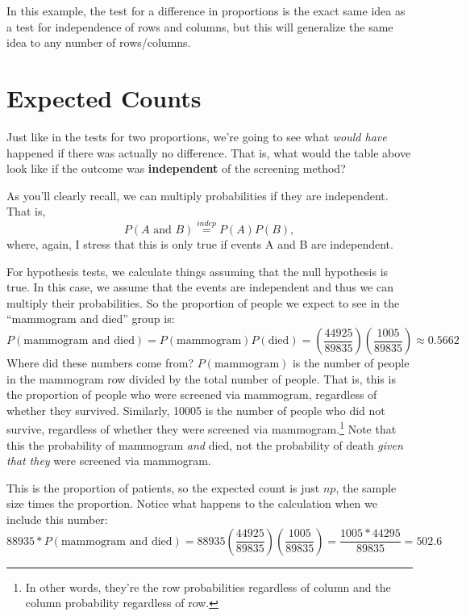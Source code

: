 \documentclass[
  letterpaper,
  DIV=11,
  numbers=noendperiod,
  oneside]{scrreprt}
\begin{document}
In this example, the test for a difference in proportions is the exact
same idea as a test for independence of rows and columns, but this will
generalize the same idea to any number of rows/columns.

\hypertarget{expected-counts}{%
\section{Expected Counts}\label{expected-counts}}

Just like in the tests for two proportions, we're going to see what
\emph{would have} happened if there was actually no difference. That is,
what would the table above look like if the outcome was
\textbf{independent} of the screening method?

As you'll clearly recall, we can multiply probabilities if they are
independent. That is, \[
P(A\text{ and }B) \stackrel{indep}{=}P(A)P(B),
\] where, again, I stress that this is only true if events A and B are
independent.

For hypothesis tests, we calculate things assuming that the null
hypothesis is true. In this case, we assume that the events are
independent and thus we can multiply their probabilities. So the
proportion of people we expect to see in the ``mammogram and died''
group is: \[
P(\text{mammogram and died}) = P(\text{mammogram})P(\text{died}) = \left(\frac{44925}{89835}\right)\left(\frac{1005}{89835}\right) \approx 0.5662
\] Where did these numbers come from? \(P(\text{mammogram})\) is the
number of people in the mammogram row divided by the total number of
people. That is, this is the proportion of people who were screened via
mammogram, regardless of whether they survived. Similarly, 10005 is the
number of people who did not survive, regardless of whether they were
screened via mammogram.\footnote{In other words, they're the row
  probabilities regardless of column and the column probability
  regardless of row.} Note that this the probability of mammogram
\emph{and} died, not the probability of death \emph{given that they}
were screened via mammogram.

This is the proportion of patients, so the expected count is just
\(np\), the sample size times the proportion. Notice what happens to the
calculation when we include this number: \[
88935 * P(\text{mammogram and died}) = 88935 \left(\frac{44925}{89835}\right)\left(\frac{1005}{89835}\right) = \frac{1005*44295}{89835} = 502.6
\]
\end{document}
